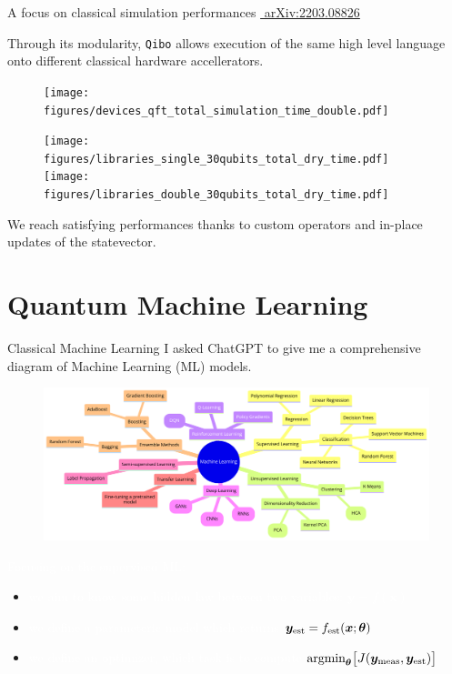\documentclass[aspectratio=169, 8pt, xcolor={svgnames}, hyperref={linkcolor=black}]{beamer}
\begin{document}
\begin{frame}{A focus on classical simulation performances \hfill \href{https://arxiv.org/abs/2203.08826}{\faBook\,\,arXiv:2203.08826}}

Through its modularity, \texttt{Qibo} allows execution of the same high level language onto 
different classical hardware accellerators.
\begin{multicols}{2}
   \begin{figure}
     \texttt{[image: figures/devices\_qft\_total\_simulation\_time\_double.pdf]} 
   \end{figure} 
   \begin{figure}
     \texttt{[image: figures/libraries\_single\_30qubits\_total\_dry\_time.pdf]} 
     \texttt{[image: figures/libraries\_double\_30qubits\_total\_dry\_time.pdf]} 
   \end{figure}
\end{multicols}
We reach satisfying performances thanks to custom operators and in-place updates of the statevector.

\end{frame}

\section{Quantum Machine Learning}

\begin{frame}{Classical Machine Learning}
I asked ChatGPT to give me a comprehensive diagram of Machine Learning (ML) models.
\begin{figure}
   \includegraphics[width=0.7\linewidth, height=0.5\textheight]{figures/ml.png}
\end{figure}  
\textcolor{white}{Focusing on the supervised ML:}
\begin{itemize}[noitemsep]
\item[] \textcolor{white}{we aim to know some hidden law between two variables: $\bm{y}=f(\bm{x})$}
\item[] \textcolor{white}{we define a parameteric model which returns $\bm{y}_{\rm est}=f_{\rm est}(\bm{x}; \bm{\theta})$}
\item[] \textcolor{white}{we define an optimizer, which task is to compute} 
   \textcolor{white}{$\text{argmin}_{\bm{\theta}}\bigl[J(\bm{y}_{\rm meas}, \bm{y}_{\rm est})\bigr]$}
\end{itemize}
\end{frame}
\end{document}
